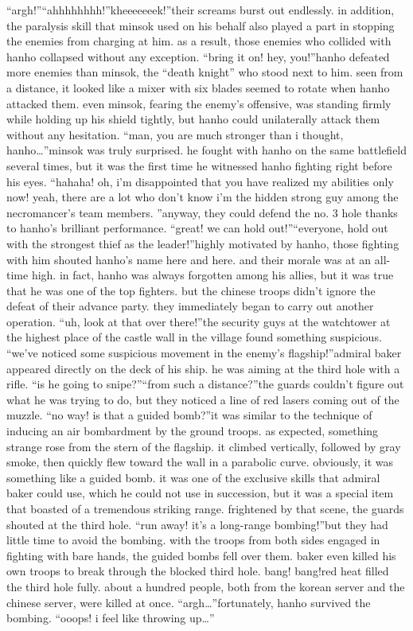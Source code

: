“argh!”“ahhhhhhhh!”kheeeeeeek!”their screams burst out endlessly.
in addition, the paralysis skill that minsok used on his behalf also played a part in stopping the enemies from charging at him.
 as a result, those enemies who collided with hanho collapsed without any exception.
“bring it on! hey, you!”hanho defeated more enemies than minsok, the “death knight” who stood next to him.
seen from a distance, it looked like a mixer with six blades seemed to rotate when hanho attacked them.
even minsok, fearing the enemy’s offensive, was standing firmly while holding up his shield tightly, but hanho could unilaterally attack them without any hesitation.
“man, you are much stronger than i thought, hanho…”minsok was truly surprised.
 he fought with hanho on the same battlefield several times, but it was the first time he witnessed hanho fighting right before his eyes.
“hahaha! oh, i’m disappointed that you have realized my abilities only now! yeah, there are a lot who don’t know i’m the hidden strong guy among the necromancer’s team members.
”anyway, they could defend the no.
 3 hole thanks to hanho’s brilliant performance.
“great! we can hold out!”“everyone, hold out with the strongest thief as the leader!”highly motivated by hanho, those fighting with him shouted hanho’s name here and here.
 and their morale was at an all-time high.
in fact, hanho was always forgotten among his allies, but it was true that he was one of the top fighters.
but the chinese troops didn’t ignore the defeat of their advance party.
 they immediately began to carry out another operation.
“uh, look at that over there!”the security guys at the watchtower at the highest place of the castle wall in the village found something suspicious.
“we’ve noticed some suspicious movement in the enemy’s flagship!”admiral baker appeared directly on the deck of his ship.
 he was aiming at the third hole with a rifle.
“is he going to snipe?”“from such a distance?”the guards couldn’t figure out what he was trying to do, but they noticed a line of red lasers coming out of the muzzle.
“no way! is that a guided bomb?”it was similar to the technique of inducing an air bombardment by the ground troops.
 as expected, something strange rose from the stern of the flagship.
it climbed vertically, followed by gray smoke, then quickly flew toward the wall in a parabolic curve.
 obviously, it was something like a guided bomb.
it was one of the exclusive skills that admiral baker could use, which he could not use in succession, but it was a special item that boasted of a tremendous striking range.
frightened by that scene, the guards shouted at the third hole.
“run away! it’s a long-range bombing!”but they had little time to avoid the bombing.
 with the troops from both sides engaged in fighting with bare hands, the guided bombs fell over them.
 baker even killed his own troops to break through the blocked third hole.
bang! bang!red heat filled the third hole fully.
 about a hundred people, both from the korean server and the chinese server, were killed at once.
“argh…”fortunately, hanho survived the bombing.
“ooops! i feel like throwing up…”

